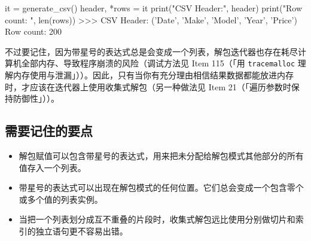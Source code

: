 \begin{codebox}[python]
it = generate_csv()
header, *rows = it
print("CSV Header:", header)
print("Row count: ", len(rows))
>>>
CSV Header: ('Date', 'Make', 'Model', 'Year', 'Price')
Row count:  200
\end{codebox}

不过要记住，因为带星号的表达式总是会变成一个列表，解包迭代器也存在耗尽计算机全部内存、导致程序崩溃的风险（调试方法见 Item 115（「用 \texttt{tracemalloc} 理解内存使用与泄漏」））。因此，只有当你有充分理由相信结果数据都能放进内存时，才应该在迭代器上使用收集式解包（另一种做法见 Item 21（「遍历参数时保持防御性」））。

\subsection{需要记住的要点}

\begin{itemize}
\item 解包赋值可以包含带星号的表达式，用来把未分配给解包模式其他部分的所有值存入一个列表。
\item 带星号的表达式可以出现在解包模式的任何位置。它们总会变成一个包含零个或多个值的列表实例。
\item 当把一个列表划分成互不重叠的片段时，收集式解包远比使用分别做切片和索引的独立语句更不容易出错。
\end{itemize}
